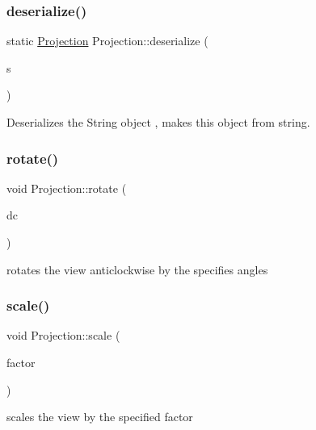 \subsubsection{\texorpdfstring{deserialize()}{deserialize()}}
{\footnotesize\ttfamily static \mbox{\hyperlink{class_projection}{Projection}} Projection\+::deserialize (\begin{DoxyParamCaption}\item[{string}]{s }\end{DoxyParamCaption})\hspace{0.3cm}{\ttfamily [static]}}



Deserializes the String object , makes this object from string. 

\mbox{\label{class_projection_a3e6794ba355fe9bd6e5d42d7133c8be4}} 
\subsubsection{\texorpdfstring{rotate()}{rotate()}}
{\footnotesize\ttfamily void Projection\+::rotate (\begin{DoxyParamCaption}\item[{\mbox{\hyperlink{class_direction_cosines}{Direction\+Cosines}}}]{dc }\end{DoxyParamCaption})}



rotates the view anticlockwise by the specifies angles 

\mbox{\label{class_projection_aba50a4b61db55f82caec3fd15d6c6e61}} 
\subsubsection{\texorpdfstring{scale()}{scale()}}
{\footnotesize\ttfamily void Projection\+::scale (\begin{DoxyParamCaption}\item[{float}]{factor }\end{DoxyParamCaption})}



scales the view by the specified factor 

\mbox{\label{class_projection_ae1fb2fe53361eef4e3e8d44dcd710be2}} 
